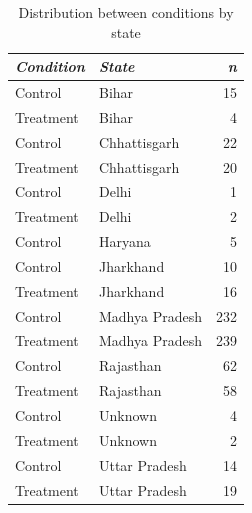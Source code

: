 \documentclass[empirical, authordate]{jote-new-article}
\begin{document}
\begin{table}

  \caption{Distribution between conditions by state}
  \label{tab:tableS40}


  \begin{tabularx}{\linewidth}{@{} X  l  r@{}}

    \toprule
    \emph{Condition} & \emph{State}   & \emph{n} \\
    \midrule
    Control          & Bihar          & 15       \\
    Treatment        & Bihar          & 4        \\
    Control          & Chhattisgarh   & 22       \\
    Treatment        & Chhattisgarh   & 20       \\
    Control          & Delhi          & 1        \\
    Treatment        & Delhi          & 2        \\
    Control          & Haryana        & 5        \\
    Control          & Jharkhand      & 10       \\
    Treatment        & Jharkhand      & 16       \\
    Control          & Madhya Pradesh & 232      \\
    Treatment        & Madhya Pradesh & 239      \\
    Control          & Rajasthan      & 62       \\
    Treatment        & Rajasthan      & 58       \\
    Control          & Unknown        & 4        \\
    Treatment        & Unknown        & 2        \\
    Control          & Uttar Pradesh  & 14       \\
    Treatment        & Uttar Pradesh  & 19       \\
    \bottomrule
  \end{tabularx}


\end{table}
\clearpage
\end{document}
